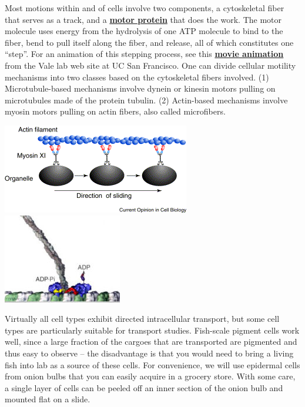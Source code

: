 \documentclass{../lab}
\begin{document}
Most motions within and of cells involve two components, a cytoskeletal fiber that serves as a track, and a \href{http://en.wikipedia.org/wiki/Motor\_protein}{\textbf{motor protein}} that does the work. The motor molecule uses energy from the hydrolysis of one ATP molecule to bind to the fiber, bend to pull itself along the fiber, and release, all of which constitutes one ``step''. For an animation of this stepping process, see this \href{https://valelab.ucsf.edu/molecular-animations/}{\textbf{movie animation}} from the Vale lab web site at UC San Francisco. One can divide cellular motility mechanisms into two classes based on the cytoskeletal fibers involved. (1) Microtubule-based mechanisms involve dynein or kinesin motors pulling on microtubules made of the protein tubulin. (2) Actin-based mechanisms involve myosin motors pulling on actin fibers, also called microfibers.

\noindent
\href{http://experimentationlab.berkeley.edu/sites/default/files/images/Myosin.gif}{\includegraphics[width=0.33\linewidth,keepaspectratio]{images/Myosin.png}}
\href{http://experimentationlab.berkeley.edu/sites/default/files/images/196px-Kinesin.jpg}{\includegraphics[width=0.33\linewidth,keepaspectratio]{images/196px-Kinesin.jpg}}

Virtually all cell types exhibit directed intracellular transport, but some cell types are particularly suitable for transport studies. Fish-scale pigment cells work well, since a large fraction of the cargoes that are transported are pigmented and thus easy to observe – the disadvantage is that you would need to bring a living fish into lab as a source of these cells. For convenience, we will use epidermal cells from onion bulbs that you can easily acquire in a grocery store. With some care, a single layer of cells can be peeled off an inner section of the onion bulb and mounted flat on a slide.
\end{document}
